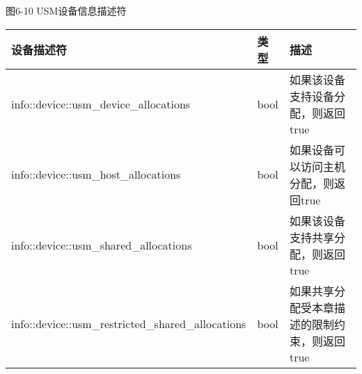 \hspace*{\fill} \par %
图6-10 USM设备信息描述符
\begin{table}[H]
	\begin{tabular}{|l|l|p{6cm}|}
		\hline
		设备描述符                                  & 类型 & 描述                                                                                   \\ \hline
		info::device::usm\_device\_allocations             & bool & 如果该设备支持设备分配，则返回true                                       \\ \hline
		info::device::usm\_host\_allocations               & bool & 如果设备可以访问主机分配，则返回true                                       \\ \hline
		info::device::usm\_shared\_allocations             & bool & 如果该设备支持共享分配，则返回true                                       \\ \hline
		info::device::usm\_restricted\_shared\_allocations & bool & 如果共享分配受本章描述的限制约束，则返回true \\ \hline
	\end{tabular}
\end{table}























